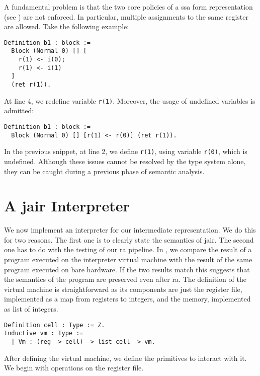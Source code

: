 A fundamental problem is that the two core policies of a \gls{ssa} form representation (see ) are not enforced. In particular, multiple assignments to the same register are allowed. Take the following example:

\begin{lstlisting}[style=Rocq]
Definition b1 : block :=
  Block (Normal 0) [] [
    r(1) <- i(0);
    r(1) <- i(1)
  ]
  (ret r(1)).
\end{lstlisting}

At line 4, we redefine variable \texttt{r(1)}.
Moreover, the usage of undefined variables is admitted:

\begin{lstlisting}[style=Rocq]
Definition b1 : block :=
  Block (Normal 0) [] [r(1) <- r(0)] (ret r(1)).
\end{lstlisting}

In the previous snippet, at line 2, we define \texttt{r(1)}, using variable \texttt{r(0)}, which is undefined.
Although these issues cannot be resolved by the type system alone, they can be caught during a previous phase of semantic analysis.

\section{A \gls{jair} Interpreter}
\label{sec:jair-vm}

We now implement an interpreter for our intermediate representation. We do this for two reasons. The first one is to clearly state the semantics of \gls{jair}. The second one has to do with the testing of our \gls{ra} pipeline. In , we compare the result of a program executed on the interpreter virtual machine with the result of the same program executed on bare hardware. If the two results match this suggests that the semantics of the program are preserved even after \gls{ra}.
The definition of the virtual machine is straightforward as its components are just the register file, implemented as a map from registers to integers, and the memory, implemented as list of integers.

\begin{lstlisting}[style=Rocq]
Definition cell : Type := Z.
Inductive vm : Type :=
  | Vm : (reg -> cell) -> list cell -> vm.
\end{lstlisting}

After defining the virtual machine, we define the primitives to interact with it. We begin with operations on the register file.

